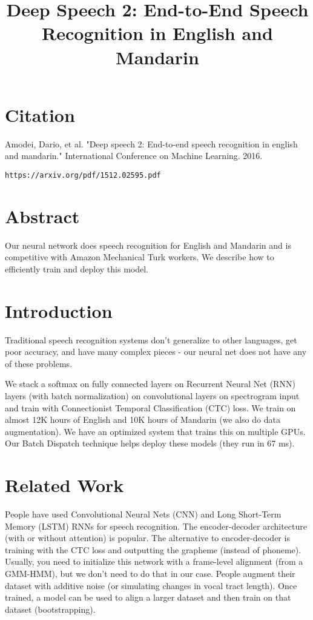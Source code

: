 \documentclass[a4paper]{article}
\title{Deep Speech 2: End-to-End Speech Recognition in
English and Mandarin}
\date{}
\begin{document}
\maketitle

\section{Citation}
Amodei, Dario, et al. "Deep speech 2: End-to-end speech recognition in english and mandarin." International Conference on Machine Learning. 2016.

\begin{verbatim}
https://arxiv.org/pdf/1512.02595.pdf
\end{verbatim}

\section{Abstract}
Our neural network does speech recognition for English and Mandarin and is
competitive with Amazon Mechanical Turk workers. We describe how to efficiently
train and deploy this model.

\section{Introduction}
Traditional speech recognition systems don't generalize to other languages,
get poor accuracy, and have many complex pieces - our neural net does not
have any of these problems.

We stack a softmax on fully connected layers on Recurrent Neural Net (RNN)
layers (with batch normalization) on convolutional layers on spectrogram input
and train with Connectionist Temporal Classification (CTC) loss. We train on
almost 12K hours of English and 10K hours of Mandarin (we also do data
augmentation). We have an optimized system that trains this on multiple GPUs.
Our Batch Dispatch technique helps deploy these models (they run in 67 ms).

\section{Related Work}
People have used Convolutional Neural Nets (CNN) and Long Short-Term Memory
(LSTM) RNNs for speech recognition. The encoder-decoder architecture (with
or without attention) is popular. The alternative to encoder-decoder is
training with the CTC loss and outputting the grapheme (instead of phoneme).
Usually, you need to initialize this network with a frame-level alignment (from
a GMM-HMM), but we don't need to do that in our case. People augment their
dataset with additive noise (or simulating changes in vocal tract length).
Once trained, a model can be used to align a larger dataset and then train on
that dataset (bootstrapping).
\end{document}
